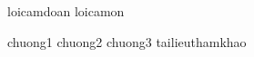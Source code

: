 \documentclass[14pt, a4paper, reqno, oneside]{book}
\theoremstyle {definition}
\numberwithin{equation}{section}
\begin{document}
\large

\fontsize{14pt}{25pt}\selectfont
\newpage

\pagestyle{plain}

{
 {loicamdoan}
 {loicamon}
\tableofcontents
\newpage
}

 {chuong1}
 {chuong2}
 {chuong3}
 {tailieuthamkhao}
\end{document}
